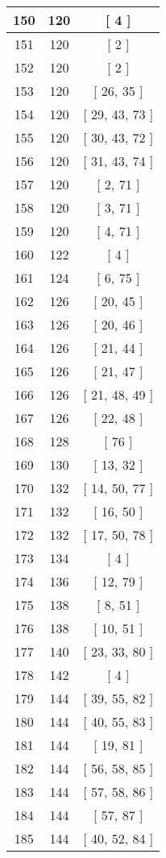 \begin{center}
\begin{longtable}[H]{|| c c c ||}
150 & 120 & [ 4 ]
\\\hline
151 & 120 & [ 2 ]
\\\hline
152 & 120 & [ 2 ]
\\\hline
153 & 120 & [ 26, 35 ]
\\\hline
154 & 120 & [ 29, 43, 73 ]
\\\hline
155 & 120 & [ 30, 43, 72 ]
\\\hline
156 & 120 & [ 31, 43, 74 ]
\\\hline
157 & 120 & [ 2, 71 ]
\\\hline
158 & 120 & [ 3, 71 ]
\\\hline
159 & 120 & [ 4, 71 ]
\\\hline
160 & 122 & [ 4 ]
\\\hline
161 & 124 & [ 6, 75 ]
\\\hline
162 & 126 & [ 20, 45 ]
\\\hline
163 & 126 & [ 20, 46 ]
\\\hline
164 & 126 & [ 21, 44 ]
\\\hline
165 & 126 & [ 21, 47 ]
\\\hline
166 & 126 & [ 21, 48, 49 ]
\\\hline
167 & 126 & [ 22, 48 ]
\\\hline
168 & 128 & [ 76 ]
\\\hline
169 & 130 & [ 13, 32 ]
\\\hline
170 & 132 & [ 14, 50, 77 ]
\\\hline
171 & 132 & [ 16, 50 ]
\\\hline
172 & 132 & [ 17, 50, 78 ]
\\\hline
173 & 134 & [ 4 ]
\\\hline
174 & 136 & [ 12, 79 ]
\\\hline
175 & 138 & [ 8, 51 ]
\\\hline
176 & 138 & [ 10, 51 ]
\\\hline
177 & 140 & [ 23, 33, 80 ]
\\\hline
178 & 142 & [ 4 ]
\\\hline
179 & 144 & [ 39, 55, 82 ]
\\\hline
180 & 144 & [ 40, 55, 83 ]
\\\hline
181 & 144 & [ 19, 81 ]
\\\hline
182 & 144 & [ 56, 58, 85 ]
\\\hline
183 & 144 & [ 57, 58, 86 ]
\\\hline
184 & 144 & [ 57, 87 ]
\\\hline
185 & 144 & [ 40, 52, 84 ]
\\\hline

\end{longtable}
\end{center}
